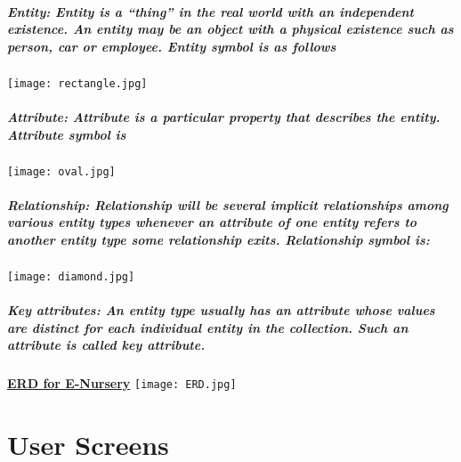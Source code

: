 \documentclass[12pt]{report}
\begin{document}
        \paragraph
        {
        \textbf{Entity: }Entity is a “thing” in the real world with an independent existence. An entity may be an object with a physical existence such as person, car or employee. Entity symbol is as follows
        }
        \begin{center}
        \texttt{[image: rectangle.jpg]}    
        \end{center}
        
        \paragraph
        {
        \textbf{Attribute: }Attribute is a particular property that describes the entity. Attribute symbol is
        }
        \begin{center}
        \texttt{[image: oval.jpg]}    
        \end{center}
        
        \paragraph
        {
        \textbf{Relationship: }Relationship will be several implicit relationships among various entity types whenever an attribute of one entity refers to another entity type some relationship exits. Relationship symbol is:
        }
        \begin{center}
            \texttt{[image: diamond.jpg]}
        \end{center}
        
        \paragraph
        {
        \textbf{Key attributes: }An entity type usually has an attribute whose values are distinct for each individual entity in the collection. Such an attribute is called key attribute. 
        }
       
        
        \begin{center}
            \pagebreak
            \textbf{\underline{ERD for E-Nursery}}    
            \texttt{[image: ERD.jpg]}
        \end{center}
    \chapter{User  Screens}
   
\end{document}
